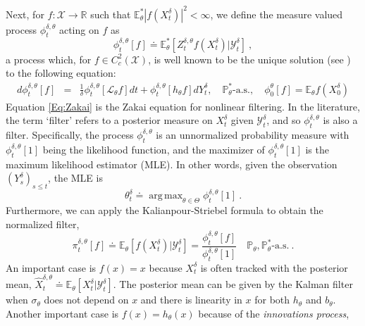 \documentclass{article}
\DeclareMathOperator*{\argmax}{arg\,max}
\begin{document}
Next, for  $f:\mathcal X\rightarrow\mathbb R$ such that $\mathbb E_\theta^*|f(X_t^\delta)|^2<\infty$, we define the measure valued process $\phi^{\delta,\theta}_{t}$ acting on $f$ as
\begin{equation}\label{eq:expFormulation}
\phi^{\delta,\theta}_{t}[f] \doteq\mathbb{E}_{\theta}^{*}\left[ Z_t^{\delta,\theta}f(X^{\delta}_{t}) \Big |\mathcal{Y}_{t}^\delta\right]\ ,
\end{equation}
a process which, for $f\in C^{2}_{c}(\mathcal{X})$, is well known to be the unique solution (see \cite{rozovsky1992}) to the following equation:
\begin{eqnarray}
d\phi^{\delta,\theta}_{t}[f]&=&\frac{1}{\delta}\phi^{\delta,\theta}_{t}[\mathcal{L}_{\theta}f]  dt + \phi^{\delta,\theta}_{t}[h_{\theta} f] dY_t^\delta,\quad \mathbb{P}_{\theta}^{*} \textrm{-a.s.},  \quad \phi_0^{\theta}[f]=\mathbb E_{\theta}f(X_0^\delta)\label{Eq:Zakai}
 \end{eqnarray}
Equation \eqref{Eq:Zakai} is the Zakai equation for nonlinear filtering. In the literature, the term `filter' refers to a posterior measure on $X_t^\delta$ given $\mathcal Y_t^\delta$, and so $\phi_t^{\delta,\theta}$ is also a filter. Specifically, the process $\phi_t^{\delta,\theta}$ is an unnormalized probability measure with $\phi_t^{\delta,\theta}[1]$ being the likelihood function, and the maximizer of $\phi_t^{\delta,\theta}[1]$ is the maximum likelihood estimator (MLE). In other words, given the observation $(Y_s^\delta)_{s\leq t}$, the MLE is
\begin{equation}
\label{Eq:MLE1}
\theta_t^\delta\doteq \argmax_{\theta\in\Theta}\phi_t^{\delta,\theta}[1]\ .
\end{equation}
Furthermore, we can apply the Kalianpour-Striebel formula to obtain the normalized filter,
\begin{equation}
\label{Eq:KSformula}
\pi^{\delta,\theta}_{t}[f]\doteq\mathbb E_{\theta}\left[f(X_t^\delta)\Big|\mathcal Y_t^\delta\right]=\frac{\phi_t^{\delta,\theta}[f]}{\phi_t^{\delta,\theta}[1]}\quad \mathbb{P}_{\theta},\mathbb{P}_{\theta}^{*} \textrm{-a.s.}\ .
\end{equation}
An important case is $f(x)=x$ because $X_t^\delta$ is often tracked with the posterior mean, $\widehat X_t^{\delta,\theta}\doteq \mathbb E_{\theta}[X_t^\delta|\mathcal Y_t^\delta].$ The posterior mean can be given by the Kalman filter when $\sigma_{\theta}$ does not depend on $x$ and there is linearity in $x$ for both $h_{\theta}$ and $b_{\theta}$. Another important case is $f(x)=h_{\theta}(x)$ because of the \textit{innovations process},
\end{document}
